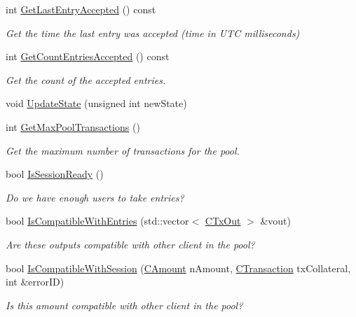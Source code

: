 \begin{DoxyCompactItemize}
\item 
int \hyperlink{class_c_sandstorm_pool_ad372fec8e07e4c39d74b1c7c6809dde5}{Get\+Last\+Entry\+Accepted} () const 
\begin{DoxyCompactList}\small\item\em Get the time the last entry was accepted (time in U\+T\+C milliseconds) \end{DoxyCompactList}\item 
int \hyperlink{class_c_sandstorm_pool_a724a0b6e9048760901010eb5da6328fd}{Get\+Count\+Entries\+Accepted} () const 
\begin{DoxyCompactList}\small\item\em Get the count of the accepted entries. \end{DoxyCompactList}\item 
void \hyperlink{class_c_sandstorm_pool_a4e48e06e3b981a9ac607a0df77428d42}{Update\+State} (unsigned int new\+State)
\item 
int \hyperlink{class_c_sandstorm_pool_a9f3cf01888cb9114e9dbd87d3fe05f10}{Get\+Max\+Pool\+Transactions} ()
\begin{DoxyCompactList}\small\item\em Get the maximum number of transactions for the pool. \end{DoxyCompactList}\item 
bool \hyperlink{class_c_sandstorm_pool_a21f1b559ed91c03e877782f29463b043}{Is\+Session\+Ready} ()
\begin{DoxyCompactList}\small\item\em Do we have enough users to take entries? \end{DoxyCompactList}\item 
bool \hyperlink{class_c_sandstorm_pool_aedb9e08d71363870b12ae5ffcf506b61}{Is\+Compatible\+With\+Entries} (std\+::vector$<$ \hyperlink{class_c_tx_out}{C\+Tx\+Out} $>$ \&vout)
\begin{DoxyCompactList}\small\item\em Are these outputs compatible with other client in the pool? \end{DoxyCompactList}\item 
bool \hyperlink{class_c_sandstorm_pool_a6ca453bd284507a2d5b26e9d4491e00c}{Is\+Compatible\+With\+Session} (\hyperlink{amount_8h_a4eaf3a5239714d8c45b851527f7cb564}{C\+Amount} n\+Amount, \hyperlink{class_c_transaction}{C\+Transaction} tx\+Collateral, int \&error\+I\+D)
\begin{DoxyCompactList}\small\item\em Is this amount compatible with other client in the pool? \end{DoxyCompactList}\item 

\end{DoxyCompactItemize}
